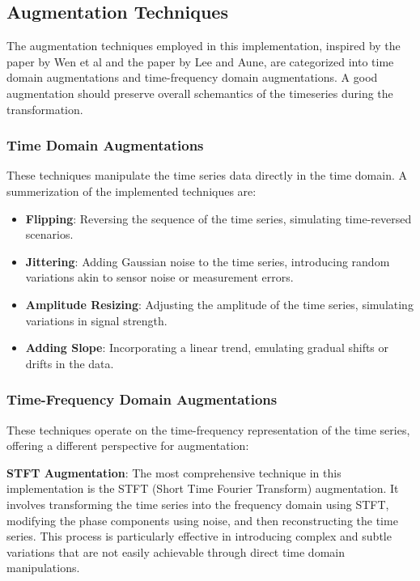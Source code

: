 \subsection{Augmentation Techniques}
The augmentation techniques employed in this implementation, inspired by the paper by Wen et al\cite{augs} and the paper by Lee and Aune\cite{SSLs}, are categorized into time domain augmentations and time-frequency domain augmentations. 
A good augmentation should preserve overall schemantics of the timeseries during the transformation. 

\subsubsection*{Time Domain Augmentations}
These techniques manipulate the time series data directly in the time domain. A summerization of the implemented techniques are:
\begin{itemize}
    \item \textbf{Flipping}: Reversing the sequence of the time series, simulating time-reversed scenarios.
    \item \textbf{Jittering}: Adding Gaussian noise to the time series, introducing random variations akin to sensor noise or measurement errors.
    \item \textbf{Amplitude Resizing}: Adjusting the amplitude of the time series, simulating variations in signal strength.
    \item \textbf{Adding Slope}: Incorporating a linear trend, emulating gradual shifts or drifts in the data.
\end{itemize}

\subsubsection*{Time-Frequency Domain Augmentations}
These techniques operate on the time-frequency representation of the time series, offering a different perspective for augmentation:

\textbf{STFT Augmentation}: The most comprehensive technique in this implementation is the STFT (Short Time Fourier Transform) augmentation. It involves transforming the time series into the frequency domain using STFT, modifying the phase components using noise, and then reconstructing the time series. This process is particularly effective in introducing complex and subtle variations that are not easily achievable through direct time domain manipulations.

